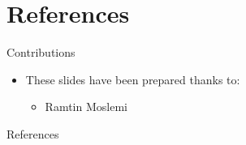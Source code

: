 \section{References}

\begin{frame}{Contributions}
    \begin{itemize}
        \item These slides have been prepared thanks to: 
	    \begin{itemize}
	        \item Ramtin Moslemi
	    \end{itemize}
    \end{itemize}
\end{frame}


\begin{frame}{References}
    
    
    \nocite{*}
\end{frame}